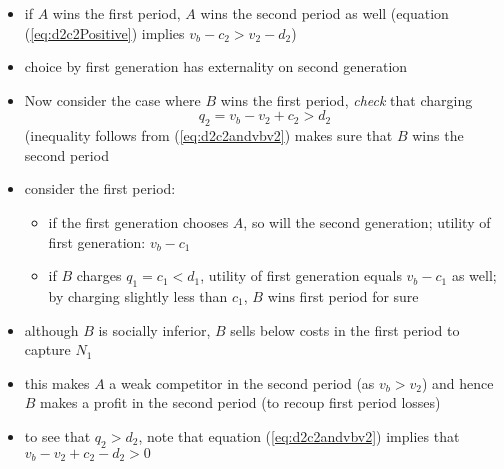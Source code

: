 \documentclass[11pt,english]{beamer}
\begin{document}
\begin{frame}[allowframebreaks]
\begin{itemize}
\item if $A$ wins the first period, $A$ wins the second period as well
  (equation (\ref{eq:d2c2Positive}) implies $v_{b}-c_{2} > v_{2}-d_{2}$)\\
\label{sec-6-1-18}%
\item choice by first generation has externality on second generation\\
\label{sec-6-1-19}%
\item Now consider the case where $B$ wins the first period, \emph{check} that charging
\label{sec-6-1-20}%
\begin{equation}
\label{eq:q2}
q_2=v_b-v_2+c_2 > d_2
\end{equation}
(inequality follows from (\ref{eq:d2c2andvbv2}) makes sure that $B$
wins the second period

\item consider the first period:
\label{sec-6-1-21}%
\begin{itemize}

\item if the first generation chooses $A$, so will the second generation; utility of first generation: $v_{b}-c_{1}$\\
\label{sec-6-1-21-1}%
\item if $B$ charges $q_{1}=c_{1}<d_{1}$, utility of first generation equals $v_{b}-c_{1}$ as well; by charging slightly less than $c_{1}$, $B$ wins first period for sure\\
\label{sec-6-1-21-2}%
\end{itemize} %

\item although $B$ is socially inferior, $B$ sells below costs in the first period to capture $N_{1}$\\
\label{sec-6-1-22}%
\item this makes $A$ a weak competitor in the second period (as $v_{b}>v_{2}$) and hence $B$ makes a profit in the second period (to recoup first period losses)\\
\label{sec-6-1-23}%
\item to see that $q_{2}>d_{2}$, note that equation (\ref{eq:d2c2andvbv2}) implies that $v_{b}-v_{2}+c_{2}-d_{2}>0$\\
\label{sec-6-1-24}%
\end{itemize} %
\end{frame}
\end{document}
